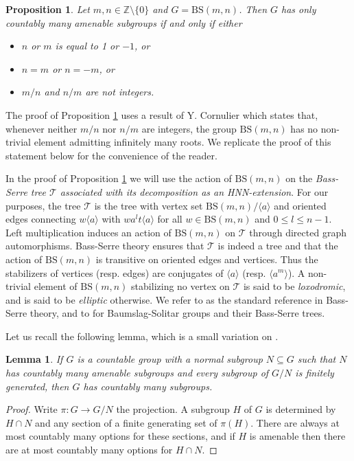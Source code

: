\documentclass[reqno,a4paper,11pt]{amsart}
\numberwithin{equation}{section}
\newcommand{\1}{\mathbf{1}}
\def\Z{{\mathbb Z}}
\def\cT{{\mathcal T}}
\newtheorem{lema}[teo]{Lemma}
\newtheorem{prop}[teo]{Proposition}
\theoremstyle{definition}
\begin{document}
\begin{prop} \label{prop:countableSubam}
	Let $m,n \in \Z \setminus \{0\}$ and $G = \mathrm{BS}(m,n)$. Then $G$ has only countably many amenable subgroups if and only if either
	\begin{itemize}
		\item $n$ or $m$ is equal to 1 or $-1$, or
		\item  $n = m$ or $n = -m$, or 
		\item $m/n$ and $n/m$ are not integers.
	\end{itemize}
\end{prop}
The proof of Proposition \ref{prop:countableSubam} uses a result of Y. Cornulier \cite{CornulierMSE2021} which states that, whenever neither $m/n$ nor $n/m$ are integers, the group $\mathrm{BS}(m,n)$ has no non-trivial element admitting infinitely many roots. We replicate the proof of this statement below for the convenience of the reader.

In the proof of Proposition \ref{prop:countableSubam} we will use the action of $\mathrm{BS}(m,n)$ on the \emph{Bass-Serre tree $\cT$ associated with its decomposition as an HNN-extension}. For our purposes, the tree $\cT$ is the tree with vertex set $\mathrm{BS}(m,n)/\langle a \rangle$ and oriented edges connecting $w \langle a \rangle$ with $wa^lt \langle a \rangle$ for all $w \in \mathrm{BS}(m,n)$ and $0 \leq l \leq n-1$. Left multiplication induces an action of $\mathrm{BS}(m,n)$ on $\cT$ through directed graph automorphisms. Bass-Serre theory ensures that $\cT$ is indeed a tree and that the action of $\mathrm{BS}(m,n)$ is transitive on oriented edges and vertices. Thus the stabilizers of vertices (resp. edges) are conjugates of $\langle a \rangle$ (resp. $\langle a^m \rangle$). A non-trivial element of $\mathrm{BS}(m,n)$ stabilizing no vertex on $\cT$ is said to be \emph{loxodromic}, and is said to be \emph{elliptic} otherwise. We refer to \cite[Chapitre I]{Serre1977} as the standard reference in Bass-Serre theory, and to \cite[Sections 1 \& 2]{CarderiGaboriauLeMaitreStalder2025} for Baumslag-Solitar groups and their Bass-Serre trees.

Let us recall the following lemma, which is a small variation on \cite[Proposition2.4]{CarderiGaboriauLeMaitreStalder2025}.
\begin{lema} \label{lema:countablesub}
	If $G$ is a countable group with a normal subgroup $N \subseteq G$ such that $N$ has countably many amenable subgroups and every subgroup of $G/N$ is finitely generated, then $G$ has countably many subgroups.
\end{lema}
\begin{proof}
	Write $\pi \colon G \to G/N$ the projection. A subgroup $H$ of $G$ is determined by $H \cap N$ and any section of a finite generating set of $\pi(H)$. There are always at most countably many options for these sections, and  if $H$ is amenable then there are at most countably many options for $H \cap N$.
\end{proof}
\end{document}
